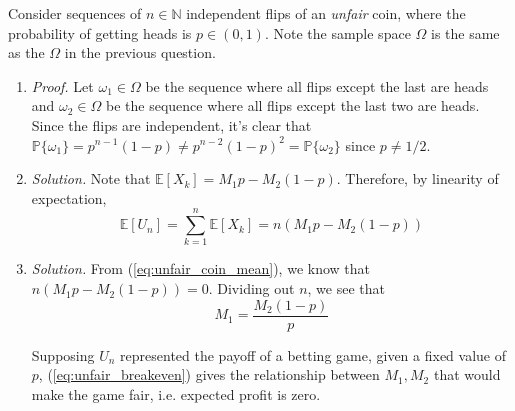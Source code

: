 \documentclass{article}
\numberwithin{equation}{section}
\begin{document}
Consider sequences of $ n \in \mathbb{N} $ independent flips of an
\textit{unfair} coin, where the probability of getting heads is
$ p \in (0, 1) $. Note the sample space $ \Omega $ is the same as the
$ \Omega $ in the previous question.
\begin{enumerate}[label = \alph*.]
    \item
    \textit{Proof.} Let $ \omega_1 \in \Omega $ be the sequence where all
    flips except the last are heads and $ \omega_2 \in \Omega $ be the
    sequence where all flips except the last two are heads. Since the flips
    are independent, it's clear that $ \mathbb{P}\{\omega_1\} =
    p^{n - 1}(1 - p) \ne p^{n - 2}(1 - p)^2 = \mathbb{P}\{\omega_2\} $ since
    $ p \ne 1 / 2 $.

    \item
    \textit{Solution.} Note that $ \mathbb{E}[X_k] = M_1p - M_2(1 - p) $.
    Therefore, by linearity of expectation,
    \begin{equation} \label{eq:unfair_coin_mean}
        \mathbb{E}[U_n] = \sum_{k = 1}^n\mathbb{E}[X_k] = n(M_1p - M_2(1 - p))
    \end{equation}

    \item
    \textit{Solution.} From (\ref{eq:unfair_coin_mean}), we know that
    $ n(M_1p - M_2(1 - p)) = 0 $. Dividing out $ n $, we see that
    \begin{equation} \label{eq:unfair_breakeven}
        M_1 = \frac{M_2(1 - p)}{p}
    \end{equation}

    Supposing $ U_n $ represented the payoff of a betting game, given a fixed
    value of $ p $, (\ref{eq:unfair_breakeven}) gives the relationship between
    $ M_1, M_2 $ that would make the game fair, i.e. expected profit is zero.
\end{enumerate}
%
%
\end{document}
